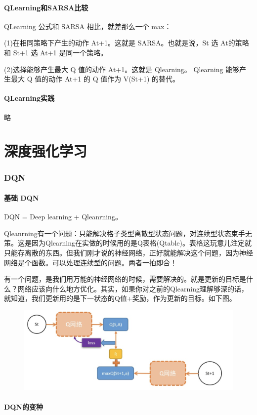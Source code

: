 \documentclass[12pt]{article}
\begin{document}
\subsection{QLearning和SARSA比较}
QLearning 公式和 SARSA 相比，就差那么一个 max：

(1)在相同策略下产生的动作 At+1。这就是 SARSA。也就是说，St 选 At的策略和 St+1 选 At+1 是同一个策略。

(2)选择能够产生最大 Q 值的动作 At+1。这就是 Qlearning。 Qlearning  能够产生最大 Q 值的动作 At+1 的 Q 值作为 V(St+1) 的替代。

\subsection{QLearning实践\cite{Implement_QLearning}}
略


\part{深度强化学习}
\section{DQN}
\subsection{基础 DQN}
DQN = Deep learning + Qleanrning。

Qleanrning有一个问题：只能解决格子类型离散型状态问题，对连续型状态束手无策。这是因为Qlearning在实做的时候用的是Q表格(Qtable)。表格这玩意儿注定就只能存离散的东西。但我们刚才说的神经网络，正好就能解决这个问题，因为神经网络是个函数。可以处理连续型的问题。两者一拍即合！

有一个问题，是我们用万能的神经网络的时候，需要解决的。就是更新的目标是什么？网络应该向什么地方优化。其实，如果你对之前的Qlearning理解够深的话，就知道，我们更新用的是下一状态的Q值+奖励，作为更新的目标。如下图。
\begin{figure}[H]
    \centering
    \includegraphics[width=.4\textwidth]{fig/ReinforcementLearning/RL_DQN_Example.png}
\end{figure}

\subsection{DQN的变种}
\end{document}
